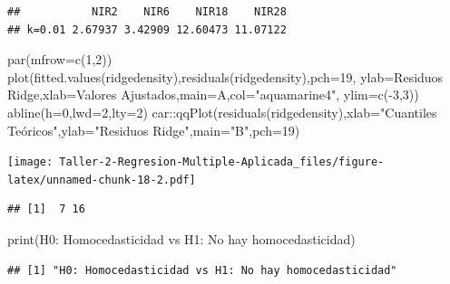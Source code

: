\documentclass[
]{article}
\newenvironment{Shaded}{\begin{snugshade}}{\end{snugshade}}
\newcommand{\AttributeTok}[1]{\textcolor[rgb]{0.77,0.63,0.00}{#1}}
\newcommand{\DecValTok}[1]{\textcolor[rgb]{0.00,0.00,0.81}{#1}}
\newcommand{\FunctionTok}[1]{\textcolor[rgb]{0.00,0.00,0.00}{#1}}
\newcommand{\NormalTok}[1]{#1}
\newcommand{\SpecialCharTok}[1]{\textcolor[rgb]{0.00,0.00,0.00}{#1}}
\newcommand{\StringTok}[1]{\textcolor[rgb]{0.31,0.60,0.02}{#1}}
\begin{document}
\begin{verbatim}
##           NIR2    NIR6    NIR18    NIR28
## k=0.01 2.67937 3.42909 12.60473 11.07122
\end{verbatim}

\begin{Shaded}
\begin{Highlighting}[]
\FunctionTok{par}\NormalTok{(}\AttributeTok{mfrow=}\FunctionTok{c}\NormalTok{(}\DecValTok{1}\NormalTok{,}\DecValTok{2}\NormalTok{))}
\FunctionTok{plot}\NormalTok{(}\FunctionTok{fitted.values}\NormalTok{(ridgedensity),}\FunctionTok{residuals}\NormalTok{(ridgedensity),}\AttributeTok{pch=}\DecValTok{19}\NormalTok{,}
     \AttributeTok{ylab=}\StringTok{\textquotesingle{}Residuos Ridge\textquotesingle{}}\NormalTok{,}\AttributeTok{xlab=}\StringTok{\textquotesingle{}Valores Ajustados\textquotesingle{}}\NormalTok{,}\AttributeTok{main=}\StringTok{\textquotesingle{}A\textquotesingle{}}\NormalTok{,}\AttributeTok{col=}\StringTok{"aquamarine4"}\NormalTok{,}
     \AttributeTok{ylim=}\FunctionTok{c}\NormalTok{(}\SpecialCharTok{{-}}\DecValTok{3}\NormalTok{,}\DecValTok{3}\NormalTok{))}
\FunctionTok{abline}\NormalTok{(}\AttributeTok{h=}\DecValTok{0}\NormalTok{,}\AttributeTok{lwd=}\DecValTok{2}\NormalTok{,}\AttributeTok{lty=}\DecValTok{2}\NormalTok{)}
\NormalTok{car}\SpecialCharTok{::}\FunctionTok{qqPlot}\NormalTok{(}\FunctionTok{residuals}\NormalTok{(ridgedensity),}\AttributeTok{xlab=}\StringTok{"Cuantiles Teóricos"}\NormalTok{,}\AttributeTok{ylab=}\StringTok{"Residuos Ridge"}\NormalTok{,}\AttributeTok{main=}\StringTok{"B"}\NormalTok{,}\AttributeTok{pch=}\DecValTok{19}\NormalTok{)}
\end{Highlighting}
\end{Shaded}

\texttt{[image: Taller-2-Regresion-Multiple-Aplicada\_files/figure-latex/unnamed-chunk-18-2.pdf]}

\begin{verbatim}
## [1]  7 16
\end{verbatim}

\begin{Shaded}
\begin{Highlighting}[]
\FunctionTok{print}\NormalTok{(}\StringTok{\textquotesingle{}H0: Homocedasticidad vs H1: No hay homocedasticidad\textquotesingle{}}\NormalTok{)}
\end{Highlighting}
\end{Shaded}

\begin{verbatim}
## [1] "H0: Homocedasticidad vs H1: No hay homocedasticidad"
\end{verbatim}
\end{document}

